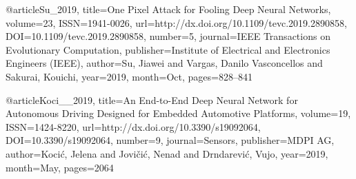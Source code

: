 
@article{Su_2019,
   title={One Pixel Attack for Fooling Deep Neural Networks},
   volume={23},
   ISSN={1941-0026},
   url={http://dx.doi.org/10.1109/tevc.2019.2890858},
   DOI={10.1109/tevc.2019.2890858},
   number={5},
   journal={IEEE Transactions on Evolutionary Computation},
   publisher={Institute of Electrical and Electronics Engineers (IEEE)},
   author={Su, Jiawei and Vargas, Danilo Vasconcellos and Sakurai, Kouichi},
   year={2019},
   month={Oct},
   pages={828–841}
}


@article{Koci__2019, 
    title={An End-to-End Deep Neural Network for Autonomous Driving Designed for Embedded Automotive Platforms}, volume={19}, ISSN={1424-8220}, url={http://dx.doi.org/10.3390/s19092064}, DOI={10.3390/s19092064}, 
    number={9}, 
    journal={Sensors}, 
    publisher={MDPI AG}, 
    author={Kocić, Jelena and Jovičić, Nenad and Drndarević, Vujo}, year={2019}, 
    month={May}, 
    pages={2064}
}